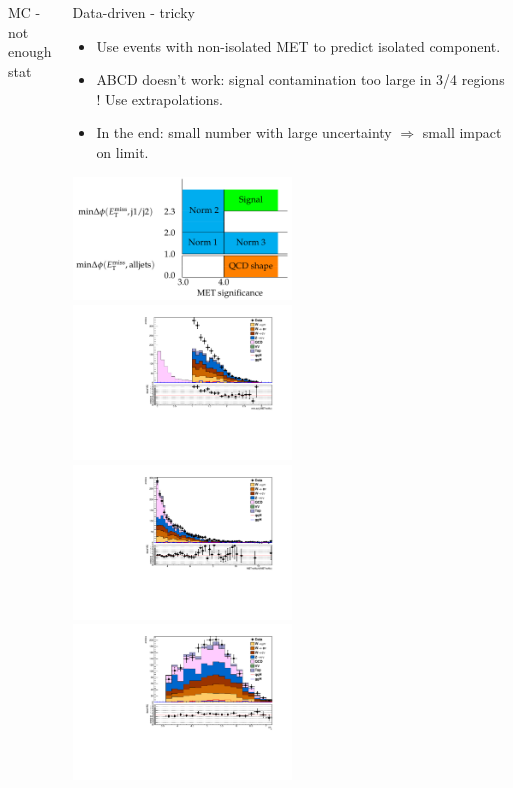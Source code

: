 \documentclass[red,compress,xcolor=table]{beamer}
\begin{document}
\begin{frame}
\begin{columns}
\begin{block}{\scriptsize MC - not enough stat}
\end{block}
\begin{block}{\scriptsize Data-driven - tricky}
\begin{itemize}
\item \scriptsize Use events with non-isolated MET to predict isolated component.
\item \scriptsize ABCD doesn't work: signal contamination too large in 3/4 regions ! Use extrapolations.
\item \scriptsize In the end: small number with large uncertainty $\Rightarrow$ small impact on limit.
\end{itemize}
\includegraphics[width=0.5\textwidth]{./schema.png}
\includegraphics[width=0.5\textwidth]{./qcdinv_3j_nunu_alljetsmetnomu_mindphi.pdf}\\
\includegraphics[width=0.5\textwidth]{./qcdinv_3j_nunu_metnomu_significance.pdf}
\includegraphics[width=0.5\textwidth]{./qcdinv_3j_nunu_dijet_deta.pdf}
\end{block}
\end{columns}


\end{frame}
\end{document}
